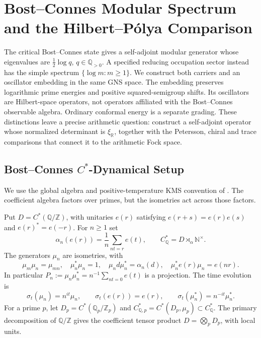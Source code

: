\chapter{Bost--Connes Modular Spectrum and the Hilbert--P\'olya Comparison}
\label{v4-arith:w5-b:hp-operator}

The critical Bost--Connes state gives a self-adjoint modular generator
whose eigenvalues are $\tfrac12\log q$, $q\in\mathbb Q_{>0}$.
A specified reducing occupation sector instead has the simple spectrum
$\{\log m:m\geq1\}$. We construct both carriers and an oscillator
embedding in the same GNS space. The embedding preserves logarithmic
prime energies and positive squared-semigroup shifts. Its oscillators
are Hilbert-space operators, not operators affiliated with the
Bost--Connes observable algebra. Ordinary conformal energy is a separate
grading. These distinctions leave a precise arithmetic question:
construct a self-adjoint operator whose normalized determinant is
$\xi_{\mathbb R}$, together with the Petersson, chiral and trace
comparisons that connect it to the arithmetic Fock space.

\section{Bost--Connes $C^*$-Dynamical Setup}
\label{v4-arith:w5-b:bc-setup}

We use the global algebra and positive-temperature KMS convention of
. The coefficient algebra factors over
primes, but the isometries act across those factors.

\begin{definition}
\label{v4-arith:w5-b:def:bc-algebra}
Put $D=C^*(\mathbb Q/\mathbb Z)$, with unitaries $e(r)$ satisfying
$e(r+s)=e(r)e(s)$ and $e(r)^*=e(-r)$. For $n\geq1$ set
\[
 \alpha_n(e(r))=\frac1n\sum_{nt=r}e(t),\qquad
 C^*_{\mathbb Q}=D\rtimes_\alpha\mathbb N^\times.
\]
The generators $\mu_n$ are isometries, with
\[
 \mu_m\mu_n=\mu_{mn},\quad \mu_n^*\mu_n=1,\quad
 \mu_n d\mu_n^*=\alpha_n(d),\quad \mu_n^*e(r)\mu_n=e(nr).
\]
In particular $P_n:=\mu_n\mu_n^*=n^{-1}\sum_{nt=0}e(t)$ is a
projection. The time evolution is
\begin{equation}
\label{v4-arith:w5-b:eq:bc-time}
 \sigma_t(\mu_n)=n^{it}\mu_n,\qquad
 \sigma_t(e(r))=e(r),\qquad \sigma_t(\mu_n^*)=n^{-it}\mu_n^*.
\end{equation}
For a prime $p$, let $D_p=C^*(\mathbb Q_p/\mathbb Z_p)$ and
$C^*_{\mathbb Q,p}=C^*(D_p,\mu_p)\subset C^*_{\mathbb Q}$.
The primary decomposition of $\mathbb Q/\mathbb Z$ gives the
coefficient tensor product $D=\bigotimes_pD_p$, with local units.
\end{definition}

